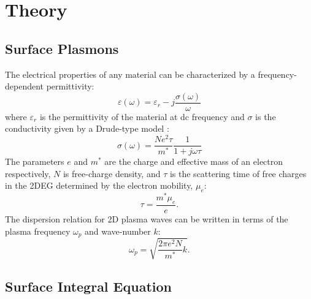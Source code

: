 \documentclass[conference, 10pt]{IEEEtran}
\renewcommand{\O}{\omega}  %
\newcommand{\E}{\varepsilon}  %
\renewcommand{\^}{\hat}  %
\begin{document}
\section{Theory}

\subsection{Surface Plasmons}
%
The electrical properties of any material can be characterized by a frequency-dependent permittivity:
%
\begin{equation}
  \E(\O)=\E_r - j\frac{\sigma(\O)}{\omega}
  \label{eq:epsilon}
\end{equation}
%
where $\E_r$ is the permittivity of the material at dc frequency and $\sigma$ is the conductivity given by a Drude-type model \cite{burke2000high}:
%
\begin{equation}
  \sigma(\O) = \frac{N e^2 \tau}{m^{\ast}}\frac{1}{1 + j \O \tau}
  \label{eq:conductivity}
\end{equation}
%
The parameters $e$ and $m^*$ are the charge and effective mass of an electron respectively, $N$ is free-charge density, and $\tau$ is the scattering time of free charges in the 2DEG determined by the electron mobility, $\mu_e$:
\begin{equation}
  \tau  = \frac{m^{\ast} \mu_e}{e}.
  \label{eq:tau}
\end{equation}
%
The dispersion relation for 2D plasma waves can be written in terms of the plasma frequency $\O_p$ and wave-number $k$:
%
\begin{equation}
  \O_{p} =  \sqrt{\frac{2 \pi e^2 N} {m^{\ast}} k}.
  \label{eq:N_2d}
\end{equation}
%
\subsection{Surface Integral Equation}
\end{document}
